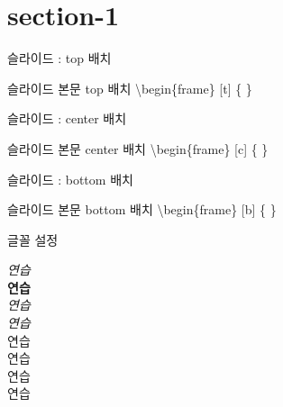 \documentclass[10pt,xcolor=pdftex,dvipsnames,table,handout]{beamer}
\begin{document}
		\section{section-1}
		\begin{frame}[t]{슬라이드 : top 배치}

			\begin{block} {슬라이드 본문 top 배치}
			\textbackslash begin\{frame\} [t] \{ \}
			\end{block}
		
		\end{frame}

		\begin{frame}[c]{슬라이드 :  center 배치 }

			\begin{block} {슬라이드 본문 center 배치}
			\textbackslash begin\{frame\} [c] \{ \}
			\end{block}

		\end{frame}

		\begin{frame}[b]{슬라이드 : bottom 배치}

			\begin{block} {슬라이드 본문 bottom 배치}
			\textbackslash begin\{frame\} [b] \{ \}
			\end{block}

		\end{frame}



		\begin{frame}[t]{글꼴 설정}

			\emph{연습} \\
			\textbf{연습} \\
			\textit{연습} \\
			\textsl{연습} \\

			\alert{연습}\\ 
			\textrm{연습}\\ 
			\textsf{연습}\\ 
			\color{green}연습 \\


		\end{frame}
\end{document}
